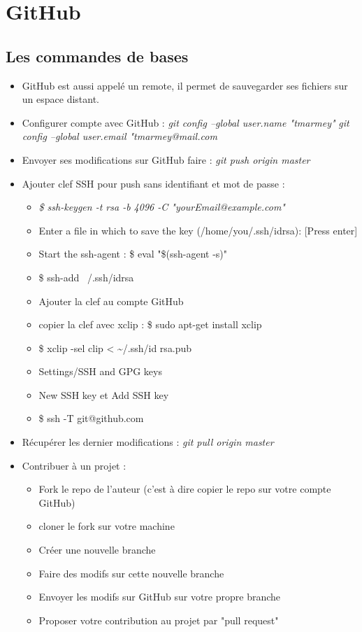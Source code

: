 \documentclass[12pt,a4paper]{article}
\begin{document}
\section{GitHub}
\subsection{Les commandes de bases}
\begin{itemize}
\item GitHub est aussi appelé un remote, il permet de sauvegarder ses fichiers sur un espace distant.
\item Configurer compte avec GitHub :
\newline \textit{git config --global user.name "tmarmey"}
\newline \textit{git config --global user.email "tmarmey@mail.com}
\item Envoyer ses modifications sur GitHub faire :
\newline \textit{git push origin master}
\item Ajouter clef SSH pour push sans identifiant et mot de passe :
\begin{itemize}
\item \textit{\$ ssh-keygen -t rsa -b 4096 -C "yourEmail@example.com"}
\item Enter a file in which to save the key (/home/you/.ssh/id\textunderscore rsa): [Press enter]
\item Start the ssh-agent : \$ eval "\$(ssh-agent -s)"
\item \$ ssh-add ~/.ssh/id\textunderscore rsa
\item Ajouter la clef au compte GitHub
\item copier la clef avec xclip : \$ sudo apt-get install xclip
\item \$ xclip -sel clip < \textasciitilde /.ssh/id \textunderscore rsa.pub
\item Settings/SSH and GPG keys
\item New SSH key et Add SSH key
\item \$ ssh -T git@github.com
\end{itemize}
\item Récupérer les dernier modifications :
\newline \textit{git pull origin master}
\item Contribuer à un projet :
\begin{itemize}
\item Fork le repo de l'auteur (c'est à dire copier le repo sur votre compte GitHub)
\item cloner le fork sur votre machine
\item Créer une nouvelle branche
\item Faire des modifs sur cette nouvelle branche
\item Envoyer les modifs sur GitHub sur votre propre branche
\item Proposer votre contribution au projet par "pull request"
\end{itemize}
\end{itemize}
\end{document}
